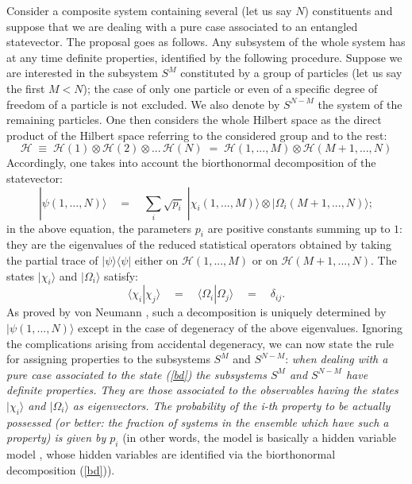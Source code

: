 \documentclass[12pt]{article}
\begin{document}
Consider a composite system containing several (let us say $N$)
constituents and suppose that we are dealing with a pure case
associated to an entangled statevector. The proposal goes as
follows. Any subsystem of the whole system has at any time
definite properties, identified by the following procedure.
Suppose we are interested in the subsystem $S^{M}$ constituted by
a group of particles (let us say the first $M < N$); the case of
only one particle or even of a specific degree of freedom of a
particle is not excluded. We also denote by $S^{N-M}$ the system
of the remaining particles. One then considers the whole Hilbert
space as the direct product of the Hilbert space referring to the
considered group and to the rest:
\begin{equation}
{\mathcal H}\; \equiv \; {\mathcal H}(1)\otimes{\mathcal H}(2)
\otimes ...\, {\mathcal H}(N) \; = \; {\mathcal H}(1, ... , M)
\otimes {\mathcal H}(M+1, ... , N)
\end{equation}
Accordingly, one takes into account the biorthonormal
decomposition of the statevector:
\begin{equation} \label{bd}
|\psi(1, ... , N)\rangle \quad = \quad \sum_{i} \sqrt{p_{i}}\;
|\chi_{i}(1, ... , M)\rangle\otimes |\Omega_{i}(M+1, ... ,
N)\rangle;
\end{equation}
in the above equation, the parameters $p_{i}$ are positive
constants summing up to $1$: they are the eigenvalues of the
reduced statistical operators obtained by taking the partial trace
of $|\psi\rangle\langle\psi|$ either on ${\mathcal H}(1, ... , M)$
or on ${\mathcal H}(M+1, ... , N)$. The states $|\chi_{i}\rangle$
and $|\Omega_{i}\rangle$ satisfy:
\begin{equation}
\langle\chi_{i}|\chi_{j}\rangle \quad = \quad
\langle\Omega_{i}|\Omega_{j}\rangle \quad = \quad \delta_{ij}.
\end{equation}
As proved by von Neumann \cite{vn}, such a decomposition is
uniquely determined by $|\psi(1, ... , N)\rangle$ except in the
case of degeneracy of the above eigenvalues. Ignoring the
complications arising from accidental degeneracy, we can now state
the rule for assigning properties to the subsystems $S^{M}$ and
$S^{N-M}$: {\it when dealing with a pure case associated to the
state (\ref{bd}) the subsystems $S^{M}$ and $S^{N-M}$ have
definite properties. They are those associated to the observables
having the states $|\chi_{i}\rangle$ and $|\Omega_{i}\rangle$ as
eigenvectors. The probability of the i-th property to be actually
possessed (or better: the fraction of systems in the ensemble
which have such a property) is given by $p_{i}$} (in other words,
the model is basically a hidden variable model \cite{bc}, whose
hidden variables are identified via the biorthonormal
decomposition (\ref{bd})).
\end{document}
